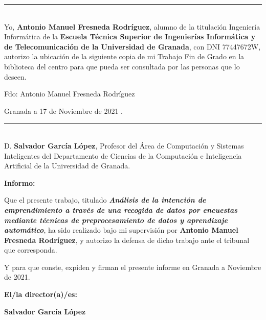 {{{{\noindent\rule[-1ex]{\textwidth}{2pt}\\[4.5ex]

Yo, \textbf{Antonio Manuel Fresneda Rodríguez}, alumno de la titulación Ingeniería Informática de la \textbf{Escuela Técnica Superior de Ingenierías Informática y de Telecomunicación de la Universidad de Granada}, con DNI 77447672W, autorizo la ubicación de la siguiente copia de mi Trabajo Fin de Grado en la biblioteca del centro para que pueda ser consultada por las personas que lo deseen.
\vspace{6cm}

\noindent Fdo: Antonio Manuel Fresneda Rodríguez
\vspace{2cm}
\begin{flushright}
	Granada a 17 de Noviembre de 2021 .
\end{flushright}

\cleardoublepage
\thispagestyle{empty}

\noindent\rule[-1ex]{\textwidth}{2pt}\\[4.5ex]

D. \textbf{Salvador García López}, Profesor del Área de Computación y Sistemas Inteligentes del Departamento de Ciencias de la Computación e Inteligencia Artificial de la Universidad de Granada.

\vspace{0.5cm}

\textbf{Informo:}

\vspace{0.5cm}

Que el presente trabajo, titulado \textit{\textbf{ Análisis de la intención de emprendimiento a través de una recogida de datos por encuestas mediante técnicas de preprocesamiento de datos y aprendizaje automático}},
ha sido realizado bajo mi supervisión por \textbf{Antonio Manuel Fresneda Rodríguez}, y autorizo la defensa de dicho trabajo ante el tribunal
que corresponda.

\vspace{0.5cm}

Y para que conste, expiden y firman el presente informe en Granada a Noviembre de 2021.

\vspace{1cm}

\textbf{El/la director(a)/es: }

\vspace{5cm}

\noindent \textbf{Salvador García López}
\pagebreak
}}}}
